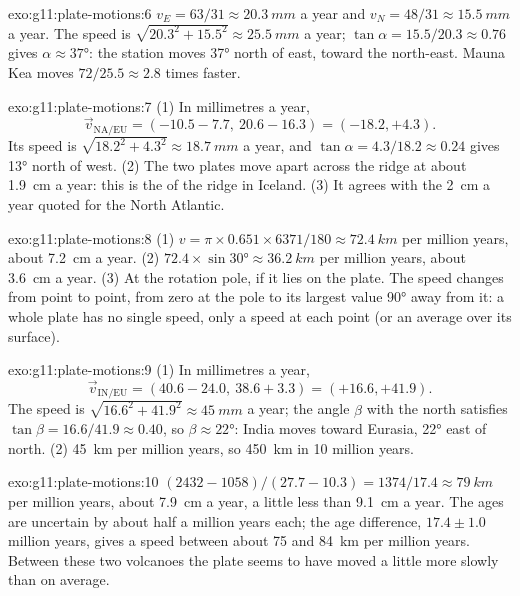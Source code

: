 \begin{solution}{exo:g11:plate-motions:6}
$v_E = 63/31 \approx \qty{20.3}{mm}$ a year and $v_N = 48/31 \approx
\qty{15.5}{mm}$ a year. The speed is $\sqrt{20.3^2 + 15.5^2} \approx
\qty{25.5}{mm}$ a year; $\tan\alpha = 15.5/20.3 \approx 0.76$ gives $\alpha
\approx \ang{37}$: the station moves \ang{37} north of east, toward the
north-east. Mauna Kea moves $72/25.5 \approx 2.8$ times faster.
\end{solution}

\begin{solution}{exo:g11:plate-motions:7}
(1) In millimetres a year,
\[
  \vec v_{\mathrm{NA/EU}} = (-10.5 - 7.7,\ 20.6 - 16.3) = (-18.2, +4.3).
\] Its speed is $\sqrt{18.2^2 + 4.3^2} \approx
\qty{18.7}{mm}$ a year, and $\tan\alpha = 4.3/18.2 \approx 0.24$ gives
\ang{13} north of west. (2) The two plates move apart across the ridge at
about \qty{1.9}{cm} a year: this is the  of the ridge in
Iceland. (3) It agrees with the \qty{2}{cm} a year quoted for the North
Atlantic.
\end{solution}

\begin{solution}{exo:g11:plate-motions:8}
(1) $v = \pi \times 0.651 \times 6371/180 \approx \qty{72.4}{km}$ per million
years, about \qty{7.2}{cm} a year. (2) $72.4 \times \sin\ang{30} \approx
\qty{36.2}{km}$ per million years, about \qty{3.6}{cm} a year. (3) At the
rotation pole, if it lies on the plate. The speed changes from point to
point, from zero at the pole to its largest value \ang{90} away from it: a
whole plate has no single speed, only a speed at each point (or an average
over its surface).
\end{solution}

\begin{solution}{exo:g11:plate-motions:9}
(1) In millimetres a year,
\[
  \vec v_{\mathrm{IN/EU}} = (40.6 - 24.0,\ 38.6 + 3.3) = (+16.6, +41.9).
\] The speed is $\sqrt{16.6^2 + 41.9^2} \approx
\qty{45}{mm}$ a year; the angle $\beta$ with the north satisfies $\tan\beta =
16.6/41.9 \approx 0.40$, so $\beta \approx \ang{22}$: India moves toward
Eurasia, \ang{22} east of north. (2) \qty{45}{km} per million years, so
\qty{450}{km} in 10 million years.
\end{solution}

\begin{solution}{exo:g11:plate-motions:10}
$(2432 - 1058)/(27.7 - 10.3) = 1374/17.4 \approx \qty{79}{km}$ per million
years, about \qty{7.9}{cm} a year, a little less than \qty{9.1}{cm} a year.
The ages are uncertain by about half a million years each; the age
difference, $17.4 \pm 1.0$ million years, gives a speed between about 75 and
\qty{84}{km} per million years. Between these two volcanoes the plate seems
to have moved a little more slowly than on average.
\end{solution}

